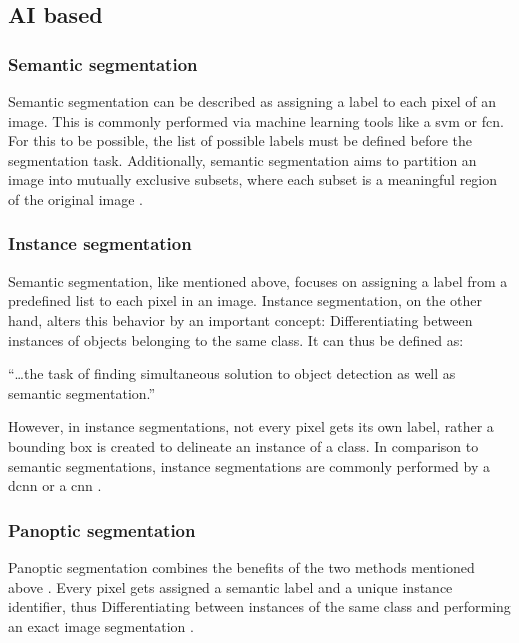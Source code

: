 \subsection{AI based}\label{s:b-seg-ai}

\subsubsection{Semantic segmentation}
Semantic segmentation can be described as assigning a label to each pixel of an image.
This is commonly performed via machine learning tools like a \acrfull{svm} or \acrfull{fcn}.
For this to be possible, the list of possible labels must be defined before the segmentation task.
Additionally, semantic segmentation aims to partition an image into mutually exclusive subsets,
where each subset is a meaningful region of the original image \cite{haoBriefSurveySemantic2020,longFullyConvolutionalNetworks2015}.

\subsubsection{Instance segmentation}
Semantic segmentation, like mentioned above, focuses on assigning a label from a predefined list to each pixel in an image.
Instance segmentation, on the other hand, alters this behavior by an important concept:
Differentiating between instances of objects belonging to the same class.
It can thus be defined as:
\begin{displayquote}
	``\ldots\space the task of finding simultaneous solution to object detection as well as semantic segmentation.''
\end{displayquote}
However, in instance segmentations, not every pixel gets its own label, rather a bounding box is created to delineate an instance of a class.
In comparison to semantic segmentations, instance segmentations are commonly performed by a \acrfull{dcnn} or a \acrfull{cnn} \cite{hafizSurveyInstanceSegmentation2020,chenMaskLabInstanceSegmentation2018}.

\subsubsection{Panoptic segmentation}
Panoptic segmentation combines the benefits of the two methods mentioned above
\cite{kirillovPanopticSegmentation2019}.
Every pixel gets assigned a semantic label and a unique instance identifier,
thus Differentiating between instances of the same class and performing an exact image segmentation
\cite{kirillovPanopticSegmentation2019}.

